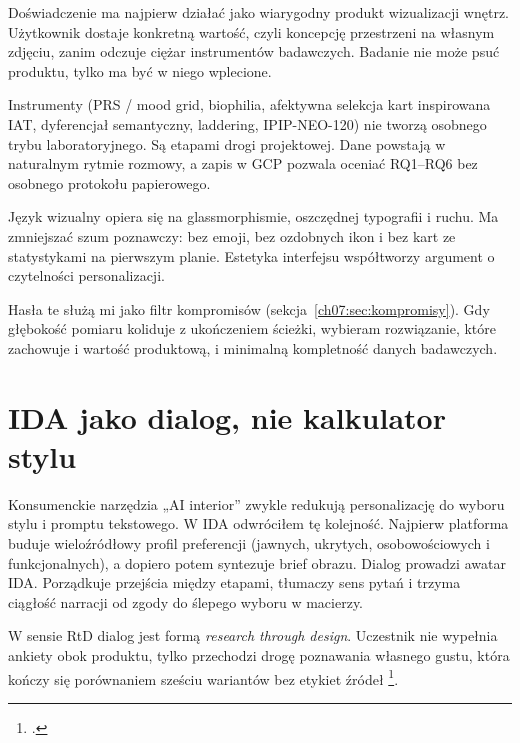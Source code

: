 \begin{description}[style=nextline]
  \item[Product-First]
    Doświadczenie ma najpierw działać jako wiarygodny produkt wizualizacji wnętrz. Użytkownik dostaje konkretną wartość, czyli koncepcję przestrzeni na własnym zdjęciu, zanim odczuje ciężar instrumentów badawczych. Badanie nie może psuć produktu, tylko ma być w niego wplecione.
  \item[Research-Embedded]
    Instrumenty (PRS / mood grid, biophilia, afektywna selekcja kart inspirowana IAT, dyferencjał semantyczny, laddering, IPIP-NEO-120) nie tworzą osobnego trybu laboratoryjnego. Są etapami drogi projektowej. Dane powstają w naturalnym rytmie rozmowy, a zapis w GCP pozwala oceniać RQ1--RQ6 bez osobnego protokołu papierowego.
  \item[Minimalist Glass Design]
    Język wizualny opiera się na glassmorphismie, oszczędnej typografii i ruchu. Ma zmniejszać szum poznawczy: bez emoji, bez ozdobnych ikon i bez kart ze statystykami na pierwszym planie. Estetyka interfejsu współtworzy argument o czytelności personalizacji.
\end{description}

Hasła te służą mi jako filtr kompromisów (sekcja~\ref{ch07:sec:kompromisy}). Gdy głębokość pomiaru koliduje z ukończeniem ścieżki, wybieram rozwiązanie, które zachowuje i wartość produktową, i minimalną kompletność danych badawczych.

\section{IDA jako dialog, nie kalkulator stylu}
\label{ch07:sec:dialog}

Konsumenckie narzędzia „AI interior” zwykle redukują personalizację do wyboru stylu i promptu tekstowego. W IDA odwróciłem tę kolejność. Najpierw platforma buduje wieloźródłowy profil preferencji (jawnych, ukrytych, osobowościowych i funkcjonalnych), a dopiero potem syntezuje brief obrazu.
Dialog prowadzi awatar IDA. Porządkuje przejścia między etapami, tłumaczy sens pytań i trzyma ciągłość narracji od zgody do ślepego wyboru w macierzy.

W sensie RtD dialog jest formą \emph{research through design}. Uczestnik nie wypełnia ankiety obok produktu, tylko przechodzi drogę poznawania własnego gustu, która kończy się porównaniem sześciu wariantów bez etykiet źródeł \footcite{zimmerman2007rtd}.

